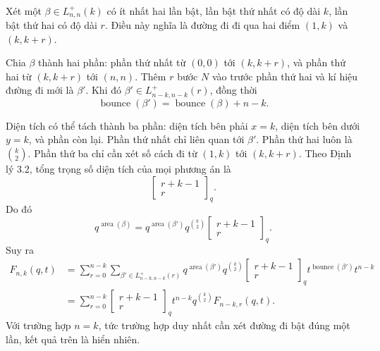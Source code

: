 \documentclass[11pt]{article}
\begin{document}
\paragraph{}
Xét một \(\beta\in L^+_{n,n}(k)\) có ít nhất hai lần bật, lần bật thứ nhất có
độ dài \(k\), lần bật thứ hai có độ dài \(r\). Điều này nghĩa là đường đi đi
qua hai điểm \((1,k)\) và \((k,k+r)\).


Chia \(\beta\) thành hai phần: phần thứ nhất từ \((0,0)\) tới \((k,k+r)\), và
phần thứ hai từ \((k,k+r)\) tới \((n,n)\). Thêm \(r\) bước \(N\) vào trước
phần thứ hai và kí hiệu đường đi mới là \(\beta'\). Khi đó
\(\beta'\in L^+_{n-k,n-k}(r)\), đồng thời
\[
  \operatorname{bounce}(\beta')=\operatorname{bounce}(\beta)+n-k.
\]

Diện tích có thể tách thành ba phần: diện tích bên phải \(x=k\), diện tích
bên dưới \(y=k\), và phần còn lại. Phần thứ nhất chỉ liên quan tới
\(\beta'\). Phần thứ hai luôn là \(\binom{k}{2}\). Phần thứ ba chỉ cần xét số
cách đi từ \((1,k)\) tới \((k,k+r)\). Theo Định lý 3.2, tổng trọng số diện
tích của mọi phương án là
\[
  \left[\begin{matrix}r+k-1\\ r\end{matrix}\right]_q.
\]
Do đó
\[
  q^{\operatorname{area}(\beta)}
  =
  q^{\operatorname{area}(\beta')}
  q^{\binom{k}{2}}
  \left[\begin{matrix}r+k-1\\ r\end{matrix}\right]_q.
\]
Suy ra
\[
\begin{aligned}
  F_{n,k}(q,t)
  &=
  \sum_{r=0}^{n-k}
  \sum_{\beta'\in L^+_{n-k,n-k}(r)}
  q^{\operatorname{area}(\beta')}
  q^{\binom{k}{2}}
  \left[\begin{matrix}r+k-1\\ r\end{matrix}\right]_q
  t^{\operatorname{bounce}(\beta')}t^{n-k} \\
  &=
  \sum_{r=0}^{n-k}
  \left[\begin{matrix}r+k-1\\ r\end{matrix}\right]_q
  t^{n-k}q^{\binom{k}{2}}F_{n-k,r}(q,t).
\end{aligned}
\]
Với trường hợp \(n=k\), tức trường hợp duy nhất cần xét đường đi bật đúng một
lần, kết quả trên là hiển nhiên.
\end{document}

